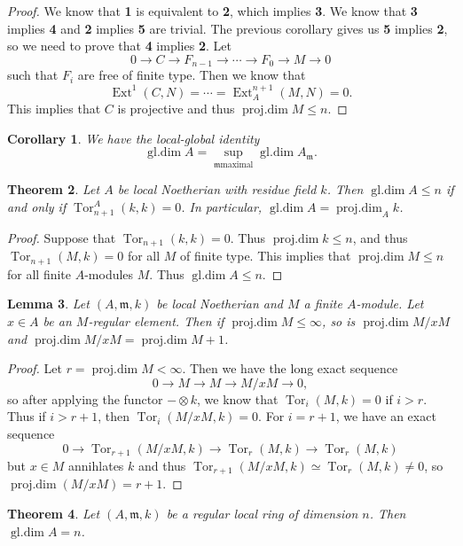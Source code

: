 \documentclass[leqno, openany]{memoir}
\newtheorem{thm}{Theorem}[section]
\newtheorem{cor}[thm]{Corollary}
\newtheorem{lem}[thm]{Lemma}
\theoremstyle{definition}
\theoremstyle{remark}
\theoremstyle{plain}
\theoremstyle{definition}
\theoremstyle{remark}
\newcommand{\mf}[1]{\mathfrak{#1}}
\DeclareMathOperator{\Ext}{Ext}
\DeclareMathOperator{\Tor}{Tor}
\DeclareMathOperator{\pdim}{proj.dim}
\DeclareMathOperator{\gdim}{gl.dim}
\begin{document}
\begin{proof} We know that \textbf{1} is equivalent to \textbf{2}, which
    implies \textbf{3}. We know that \textbf{3} implies \textbf{4} and
    \textbf{2} implies \textbf{5} are trivial. The previous corollary gives us
    \textbf{5} implies \textbf{2}, so we need to prove that \textbf{4} implies
    \textbf{2}. Let \[ 0 \to C \to F_{n-1} \to \cdots \to F_0 \to M \to 0 \]
    such that $F_i$ are free of finite type. Then we know that \[ \Ext^1(C, N)
    = \cdots = \Ext_A^{n+1}(M,N) = 0. \] This implies that $C$ is projective
    and thus $\pdim M \leq n$.  \end{proof}

\begin{cor} We have the local-global identity \[ \gdim A = \sup_{\mf{m} \text{
maximal}} \gdim A_{\mf{m}}. \] \end{cor}

\begin{thm} Let $A$ be local Noetherian with residue field $k$. Then $\gdim A
\leq n$ if and only if $\Tor_{n+1}^A(k,k) = 0$. In particular, $\gdim A =
\pdim_A k$.  \end{thm}

\begin{proof} Suppose that $\Tor_{n+1}(k,k) = 0$. Thus $\pdim k \leq n$, and
thus $\Tor_{n+1}(M, k) = 0$ for all $M$ of finite type. This implies that
$\pdim M \leq n$ for all finite $A$-modules $M$. Thus $\gdim A \leq n$.
\end{proof}

\begin{lem} Let $(A, \mf{m}, k)$ be local Noetherian and $M$ a finite
$A$-module. Let $x \in A$ be an $M$-regular element. Then if $\pdim M \leq
\infty$, so is $\pdim M/xM$ and $\pdim M/xM = \pdim M + 1$.  \end{lem}

\begin{proof} Let $r = \pdim M < \infty$. Then we have the long exact sequence
    \[ 0 \to M \to M \to M/xM \to 0, \] so after applying the functor $-
    \otimes k$, we know that $\Tor_i(M,k) = 0$ if $i > r$. Thus if $i > r+1$,
    then $\Tor_i(M/xM, k) = 0$. For $i = r+1$, we have an exact sequence \[ 0
    \to \Tor_{r+1}(M/xM, k) \to \Tor_r(M,k) \to \Tor_r(M,k) \] but $x \in M$
    annihlates $k$ and thus $\Tor_{r+1}(M/xM, k) \simeq \Tor_r(M,k) \neq 0$, so
    $\pdim(M/xM) = r+1$.  \end{proof}

\begin{thm} Let $(A,\mf{m}, k)$ be a regular local ring of dimension $n$. Then
$\gdim A = n$.  \end{thm}
\end{document}
